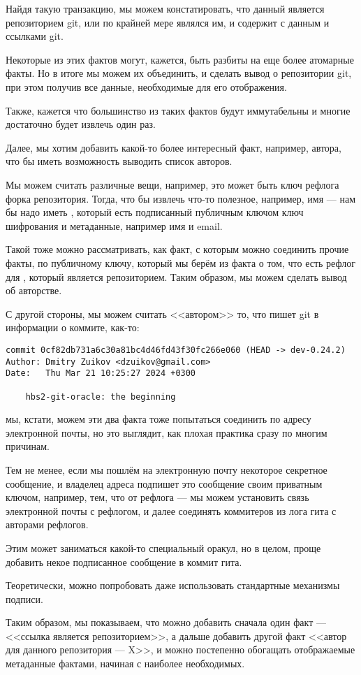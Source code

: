 Найдя такую транзакцию, мы можем констатировать, что данный  является
репозиторием git, или по крайней мере являлся им, и содержит  с данным
 и ссылками git.

Некоторые из этих фактов могут, кажется, быть разбиты на еще более атомарные факты. Но в итоге мы
можем их объединить, и сделать вывод  о репозитории git, при этом получив все данные, необходимые
для его отображения.

Также, кажется что большинство из таких фактов будут иммутабельны и многие достаточно будет извлечь
один раз.

Далее, мы хотим добавить какой-то более интересный факт, например, автора, что бы иметь возможность
выводить список авторов.

Мы можем считать  различные вещи, например, это может быть ключ рефлога
форка репозитория. Тогда, что бы извлечь что-то полезное, например, имя --- нам бы надо иметь
, который есть подписанный публичным ключом ключ шифрования и метаданные,
например имя и email.

Такой  тоже можно рассматривать, как факт, с которым можно соединить
прочие факты, по публичному ключу, который мы берём из факта о том, что есть рефлог для
, который является репозиторием. Таким образом, мы можем сделать вывод
об авторстве.

С другой стороны, мы можем считать <<автором>> то, что пишет git в информации о коммите, как-то:

\begin{verbatim}
commit 0cf82db731a6c30a81bc4d46fd43f30fc266e060 (HEAD -> dev-0.24.2)
Author: Dmitry Zuikov <dzuikov@gmail.com>
Date:   Thu Mar 21 10:25:27 2024 +0300

    hbs2-git-oracle: the beginning
\end{verbatim}


мы, кстати, можем эти два факта тоже попытаться соединить по адресу
электронной почты, но это выглядит, как плохая практика сразу по многим причинам.

Тем не менее, если мы пошлём на электронную почту некоторое секретное сообщение, и владелец адреса
подпишет это сообщение своим приватным ключом, например, тем, что от рефлога --- мы можем установить
связь электронной почты с рефлогом, и далее соединять коммитеров из лога гита с авторами рефлогов.

Этим может заниматься какой-то специальный оракул, но в целом, проще добавить некое подписанное
сообщение в коммит гита.

Теоретически, можно попробовать даже использовать стандартные механизмы подписи.

Таким образом, мы показываем, что можно добавить сначала один факт --- <<ссылка является
репозиторием>>, а дальше добавить другой факт <<автор для данного репозитория --- X>>, и можно
постепенно обогащать отображаемые метаданные фактами, начиная с наиболее необходимых.


